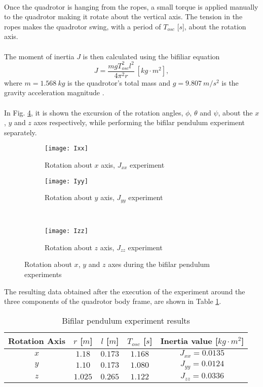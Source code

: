 \\Once the quadrotor is hanging from the ropes, a small torque is applied manually to the quadrotor making it rotate about the vertical axis. The tension in the ropes makes the quadrotor swing, with a period of $T_{osc}$ [$s$], about the rotation axis.
\\\\
The moment of inertia $J$ is then calculated using the bifiliar equation
\begin{equation}
J = \dfrac{mgT_{osc}^{2}l^{2}}{4\pi^{2}r}\ [kg\cdot m^{2}],
\end{equation}
where $m = 1.568\ kg$ is the quadrotor's total mass and $g = 9.807\ m/s^{2}$ is the gravity acceleration magnitude \cite{Mustapa2016}.
\\\\
In Fig. \ref{fig:inertiatest}, it is shown the excursion of the rotation angles, $\phi$, $\theta$ and $\psi$, about the $x$, $y$ and $z$ axes respectively, while performing the bifilar pendulum experiment separately.
\begin{figure}[H]
\begin{subfigure}{.5\linewidth}
\centering
\texttt{[image: Ixx]}
\caption{Rotation about $x$ axis, $J_{xx}$ experiment}
\label{fig:Jxx}
\end{subfigure}%
\begin{subfigure}{.5\linewidth}
\centering
\texttt{[image: Iyy]}
\caption{Rotation about $y$ axis, $J_{yy}$ experiment}
\label{fig:Jyy}
\end{subfigure}\\[1ex]
\begin{subfigure}{\linewidth}
\centering
\texttt{[image: Izz]}
\caption{Rotation about $z$ axis, $J_{zz}$ experiment}
\label{fig:Jzz}
\end{subfigure}
\caption{Rotation about $x$, $y$ and $z$ axes during the bifilar pendulum experiments}
\label{fig:inertiatest}
\end{figure}
The resulting data obtained after the execution of the experiment around the three components of the quadrotor body frame, are shown in Table \ref{tb:inertiaexperiment}.
\begin{table}[H]
\small
\begin{center}
\caption{Bifilar pendulum experiment results}\label{tb:inertiaexperiment}
\begin{tabular}{c|c|c|c|c}\hline
\rule{0pt}{3ex} Rotation Axis & $r$ [$m$] & $l$ [$m$] & $T_{osc}$ [$s$] & Inertia value [$kg\cdot m^{2}$] \\\hline\hline
\rule{0pt}{3ex} $x$ &  $1.18$ & $0.173$ & $1.168$ & $J_{xx} = 0.0135$ \\[0.7ex]
$y$ &  $1.10$ & $0.173$ & $1.080$ & $J_{yy} = 0.0124$ \\[0.7ex]
$z$ &  $1.025$ & $0.265$ & $1.122$ & $J_{zz} = 0.0336$ \\[0.7ex]\hline
\end{tabular}
\end{center}
\end{table}

